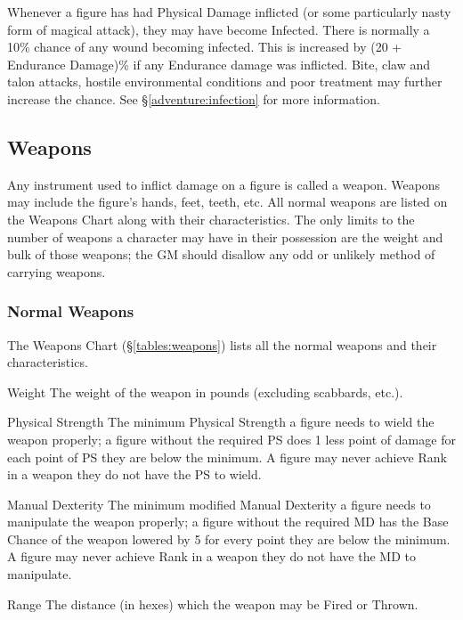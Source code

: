 \begin{multicols*}{3}
Whenever a figure has had Physical Damage inflicted (or some
particularly nasty form of magical attack), they may have become
Infected. There is normally a 10\% chance of any wound becoming
infected. This is increased by (20 + Endurance Damage)\% if any
Endurance damage was inflicted. Bite, claw and talon attacks, hostile
environmental conditions and poor treatment may further increase the
chance.  See \S\ref{adventure:infection} for more information.

\subsection{Weapons}

Any instrument used to inflict damage on a figure is called a weapon.
Weapons may include the figure's hands, feet, teeth, etc.  All normal
weapons are listed on the Weapons Chart along with their
characteristics. The only limits to the number of weapons a character
may have in their possession are the weight and bulk of those weapons;
the GM should disallow any odd or unlikely method of carrying weapons.

\subsubsection{Normal Weapons}

The Weapons Chart (\S \ref{tables:weapons}) lists all the normal
weapons and their characteristics.

\begin{Description}

\item[Weight] The weight of the weapon in pounds (excluding scabbards,
etc.).

\item[Physical Strength] The minimum Physical Strength a figure needs
to wield the weapon properly; a figure without the required PS does 1
less point of damage for each point of PS they are below the
minimum. A figure may never achieve Rank in a weapon they do not have
the PS to wield.

\item[Manual Dexterity] The minimum modified Manual Dexterity a figure
needs to manipulate the weapon properly; a figure without the required
MD has the Base Chance of the weapon lowered by 5 for every point they
are below the minimum. A figure may never achieve Rank in a weapon
they do not have the MD to manipulate.

\item[Range] The distance (in hexes) which the weapon may be Fired or
Thrown.


\end{Description}
\end{multicols*}
